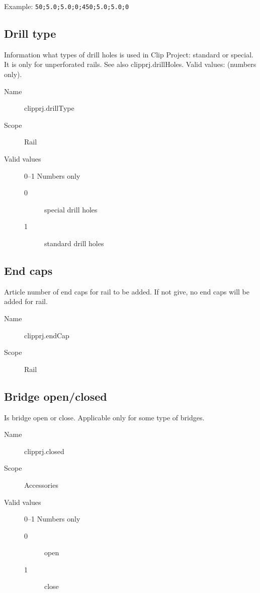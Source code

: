 \documentclass[%
	a4paper,
	oneside,
	listof=numbered,
	parskip=half,
	headsepline=true,
	footsepline=false,
	0.7headlines,
	]{scrbook}
\begin{document}
Example: \verb|50;5.0;5.0;0;450;5.0;5.0;0|

\subsection{Drill type}

Information what types of drill holes is used in Clip Project: standard or special.
It is only for unperforated rails.
See also clipprj.drillHoles.
Valid values: (numbers only).

\begin{description}
	\item[Name] clipprj.drillType
	\item[Scope] Rail
	\item[Valid values] 0--1 Numbers only
	\begin{description}
		\item[0] special drill holes
		\item[1] standard drill holes
	\end{description}
\end{description}

\subsection{End caps}

Article number of end caps for rail to be added.
If not give, no end caps will be added for rail.

\begin{description}
	\item[Name] clipprj.endCap
	\item[Scope] Rail
\end{description}

\subsection{Bridge open/closed}

Is bridge open or close.
Applicable only for some type of bridges.

\begin{description}
	\item[Name] clipprj.closed
	\item[Scope] Accessories
	\item[Valid values] 0--1 Numbers only
	\begin{description}
		\item[0] open
		\item[1] close
	\end{description}
\end{description}
\end{document}
